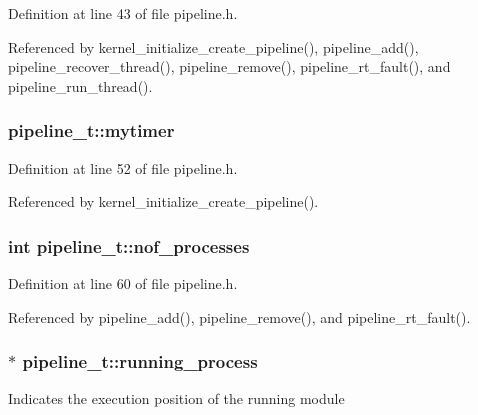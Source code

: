 Definition at line 43 of file pipeline.\-h.



Referenced by kernel\-\_\-initialize\-\_\-create\-\_\-pipeline(), pipeline\-\_\-add(), pipeline\-\_\-recover\-\_\-thread(), pipeline\-\_\-remove(), pipeline\-\_\-rt\-\_\-fault(), and pipeline\-\_\-run\-\_\-thread().

\hypertarget{structpipeline__t_ab49193f9dbfbddaee1b5327c2ece0fb8}{
\subsubsection[{mytimer}]{ pipeline\-\_\-t\-::mytimer}}\label{structpipeline__t_ab49193f9dbfbddaee1b5327c2ece0fb8}


Definition at line 52 of file pipeline.\-h.



Referenced by kernel\-\_\-initialize\-\_\-create\-\_\-pipeline().

\hypertarget{structpipeline__t_af1260ecb0c7e3429f031708d1eebaf04}{
\subsubsection[{nof\-\_\-processes}]{\setlength{\rightskip}{0pt plus 5cm}int pipeline\-\_\-t\-::nof\-\_\-processes}}\label{structpipeline__t_af1260ecb0c7e3429f031708d1eebaf04}


Definition at line 60 of file pipeline.\-h.



Referenced by pipeline\-\_\-add(), pipeline\-\_\-remove(), and pipeline\-\_\-rt\-\_\-fault().

\hypertarget{structpipeline__t_a8c842f2d27e3f3a3ff933d5a2ee409fa}{
\subsubsection[{running\-\_\-process}]{$\ast$ pipeline\-\_\-t\-::running\-\_\-process}}\label{structpipeline__t_a8c842f2d27e3f3a3ff933d5a2ee409fa}
Indicates the execution position of the running module 

